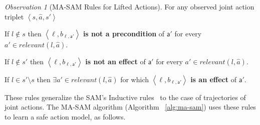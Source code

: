 \documentclass[letterpaper]{article} %
\theoremstyle{definition}
\theoremstyle{remark}
\newtheorem{observation}{Observation}
\newcommand{\tuple}[1]{\ensuremath{\left \langle #1 \right \rangle }}
\newcommand{\relevant}{\textit{relevant}}
\newcommand{\liftl}{\ensuremath{\ell}}
\newcommand{\liftatag}{\mathsf{a}'}
\newcommand{\sam}{\ac{SAM}\xspace}
\newcommand{\masam}{\ac{MA-SAM}\xspace}
\begin{document}
\begin{observation}[MA-SAM Rules for Lifted Actions]\label{def:lifted-ma-sam}
For any observed joint action triplet $\tuple{s,\hat{a},s'}$
\begin{compactenum}
    \item If $l\notin s$ then $\tuple{\liftl,b_{\liftl,\liftatag}}$ \textbf{is not a precondition} of $\liftatag$ for every $a'\in \relevant(l,\hat{a})$.

    \item If $l\notin s'$ then $\tuple{\liftl,b_{\liftl,\liftatag}}$ \textbf{is not an effect} of $\liftatag$ for every $a'\in \relevant(l,\hat{a})$.
    
    \item If $l\in s'\setminus s$ then $\exists a'\in \relevant(l,\hat{a})$ for which 
    $\tuple{\liftl,b_{\liftl,\liftatag}}$ \textbf{is an effect} of $\liftatag$. 
\end{compactenum}
\end{observation}
\noindent These rules generalize the \sam's Inductive rules~\cite{juba2021safe} to the case of trajectories of joint actions. The \masam algorithm (Algorithm~
\ref{alg:ma-sam}) uses these rules to learn a safe action model, as follows. 
\end{document}
